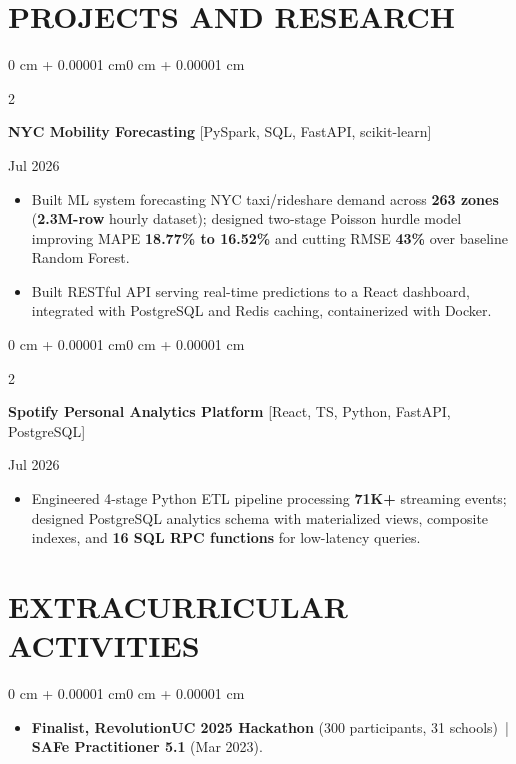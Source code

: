 \documentclass[10pt, letterpaper]{article}
\newenvironment{highlights}{
    \begin{itemize}[
        topsep=0.10 cm,
        parsep=0.06 cm,
        partopsep=0pt,
        itemsep=0.06 cm,
        leftmargin=12pt
    ]
}{
    \end{itemize}
}
\newenvironment{onecolentry}{
    \begin{adjustwidth}{0 cm + 0.00001 cm}{0 cm + 0.00001 cm}
}{
    \end{adjustwidth}
}
\newenvironment{twocolentry}[2][]{
    \onecolentry
    \def\secondColumn{#2}
    \setcolumnwidth{\fill, 4.5 cm}
    \begin{paracol}{2}
}{
    \switchcolumn \raggedleft \secondColumn
    \end{paracol}
    \endonecolentry
}
\begin{document}
\section{PROJECTS AND RESEARCH}
\begin{twocolentry}{Jul 2026}
\textbf{NYC Mobility Forecasting} [PySpark, SQL, FastAPI, scikit-learn]
\end{twocolentry}
\begin{highlights}
  \item Built ML system forecasting NYC taxi/rideshare demand across \textbf{263 zones} (\textbf{2.3M-row} hourly dataset); designed two-stage Poisson hurdle model improving MAPE \textbf{18.77\% to 16.52\%} and cutting RMSE \textbf{43\%} over baseline Random Forest.
  \item Built RESTful API serving real-time predictions to a React dashboard, integrated with PostgreSQL and Redis caching, containerized with Docker.
\end{highlights}

\vspace{0.12 cm}

\begin{twocolentry}{Jul 2026}
\textbf{Spotify Personal Analytics Platform} [React, TS, Python, FastAPI, PostgreSQL]
\end{twocolentry}
\begin{highlights}
  \item Engineered 4-stage Python ETL pipeline processing \textbf{71K+} streaming events; designed PostgreSQL analytics schema with materialized views, composite indexes, and \textbf{16 SQL RPC functions} for low-latency queries.
\end{highlights}

\section{EXTRACURRICULAR ACTIVITIES}
\begin{onecolentry}
\begin{highlights}
  \item \textbf{Finalist, RevolutionUC 2025 Hackathon} (300 participants, 31 schools) \,|\, \textbf{SAFe Practitioner 5.1} (Mar 2023).
\end{highlights}
\end{onecolentry}
\end{document}
